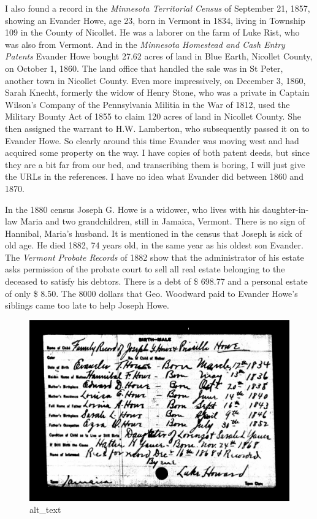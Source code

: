\documentclass[
  12pt,
]{book}
\begin{document}
I also found a record in the \emph{Minnesota Territorial Census} of September 21, 1857, showing an Evander Howe, age 23, born in Vermont in 1834, living in Township 109 in the County of Nicollet. He was a laborer on the farm of Luke Rist, who was also from Vermont. And in the \emph{Minnesota Homestead and Cash Entry Patents} Evander Howe bought 27.62 acres of land in Blue Earth, Nicollet County, on October 1, 1860. The land office that handled the sale was in St Peter, another town in Nicollet County. Even more impressively, on December 3, 1860, Sarah Knecht, formerly the widow of Henry Stone, who was a private in Captain Wilson's Company of the Pennsylvania Militia in the War of 1812, used the Military Bounty Act of 1855 to claim 120 acres of land in Nicollet County. She then assigned the warrant to H.W. Lamberton, who subsequently passed it on to Evander Howe. So clearly around this time Evander was moving west and had acquired some property on the way. I have copies of both patent deeds, but since they are a bit far from our bed, and transcribing them is boring, I will just give the URLs in the references. I have no idea what Evander did between 1860 and 1870.

In the 1880 census Joseph G. Howe is a widower, who lives with his daughter-in-law Maria and two grandchildren, still in Jamaica, Vermont. There is no sign of Hannibal, Maria's husband. It is mentioned in the census that Joseph is sick of old age. He died 1882, 74 years old, in the same year as his oldest son Evander. The \emph{Vermont Probate Records} of 1882 show that the administrator of his estate asks permission of the probate court to sell all real estate belonging to the deceased to satisfy his debtors. There is a debt of \$ 698.77 and a personal estate of only \$ 8.50. The 8000 dollars that Geo. Woodward paid to Evander Howe's siblings came too late to help Joseph Howe.

\begin{figure}
\centering
\includegraphics{images/0201b_images/image5.jpg}
\caption{alt\_text}
\end{figure}
\end{document}
